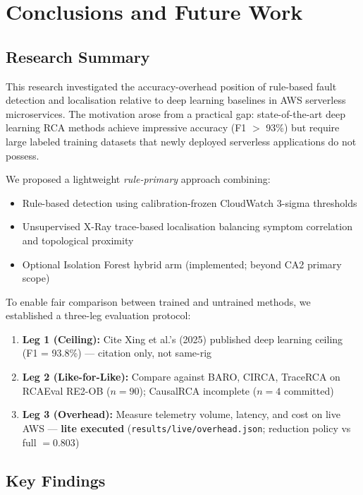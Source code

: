 \chapter{Conclusions and Future Work}

\section{Research Summary}

This research investigated the accuracy-overhead position of rule-based fault detection and localisation relative to deep learning baselines in AWS serverless microservices. The motivation arose from a practical gap: state-of-the-art deep learning RCA methods achieve impressive accuracy (F1 $>$ 93\%) but require large labeled training datasets that newly deployed serverless applications do not possess.

We proposed a lightweight \emph{rule-primary} approach combining:
\begin{itemize}
    \item Rule-based detection using calibration-frozen CloudWatch 3-sigma thresholds
    \item Unsupervised X-Ray trace-based localisation balancing symptom correlation and topological proximity
    \item Optional Isolation Forest hybrid arm (implemented; beyond CA2 primary scope)
\end{itemize}

To enable fair comparison between trained and untrained methods, we established a three-leg evaluation protocol:
\begin{enumerate}
    \item \textbf{Leg 1 (Ceiling):} Cite Xing et al.'s (2025) published deep learning ceiling (F1 = 93.8\%) --- citation only, not same-rig
    \item \textbf{Leg 2 (Like-for-Like):} Compare against BARO, CIRCA, TraceRCA on RCAEval RE2-OB ($n{=}90$); CausalRCA incomplete ($n{=}4$ committed)
    \item \textbf{Leg 3 (Overhead):} Measure telemetry volume, latency, and cost on live AWS --- \textbf{lite executed} (\texttt{results/live/overhead.json}; reduction policy vs full $=0.803$)
\end{enumerate}

\section{Key Findings}

